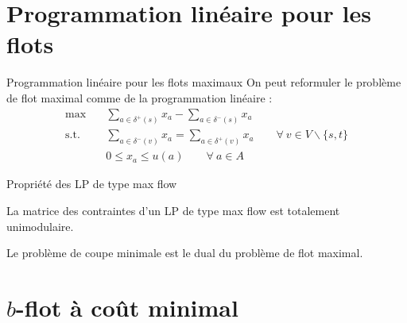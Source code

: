 \documentclass{beamer}
\begin{document}


\section{Programmation linéaire pour les flots}

\begin{frame}{Programmation linéaire pour les flots maximaux} \pause
  On peut reformuler le problème de flot maximal comme de la programmation linéaire : \pause
  \begin{align*}
    \max \quad & \sum_{a \in \delta^+(s)} x_a - \sum_{a \in \delta^-(s)} x_a \\
    \mathrm{s.t.} \quad &
      \sum_{a \in \delta^-(v)} x_a = \sum_{a \in \delta^+(v)} x_a \quad \quad \forall~ v \in V \backslash \{s, t\} \\
      & 0 \leq x_a \leq u(a) \quad \quad \forall~ a \in A
  \end{align*}
\end{frame}

\begin{frame}[t]{Propriété des LP de type max flow} \pause
  \begin{proposition}[6.11]
    La matrice des contraintes d'un LP de type max flow est totalement unimodulaire.
  \end{proposition}
  
  \vfill \pause

  \begin{proposition}[6.12]
    Le problème de coupe minimale est le dual du problème de flot maximal.
  \end{proposition}
  
  \vfill
\end{frame}





\section{$b$-flot à coût minimal}
\end{document}
